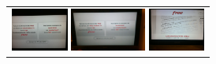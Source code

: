 \documentclass{acm_proc_article-sp}
\newcommand{\thumbheight}{14mm}
\newenvironment{thumbsequence}{}{\makebox[4mm]{}}
\begin{document}
\begin{figure}
\begin{tabular}{p{\textwidth}}
\begin{thumbsequence}
		\includegraphics[height=\thumbheight]{resources/free/looseduplicate13.jpg}
		\includegraphics[height=\thumbheight]{resources/free/looseduplicate14.jpg}
	\end{thumbsequence}
	\begin{thumbsequence}
		\includegraphics[height=\thumbheight]{resources/free/looseduplicate5.jpg}

\end{thumbsequence}
\end{tabular}
\end{figure}
\end{document}
